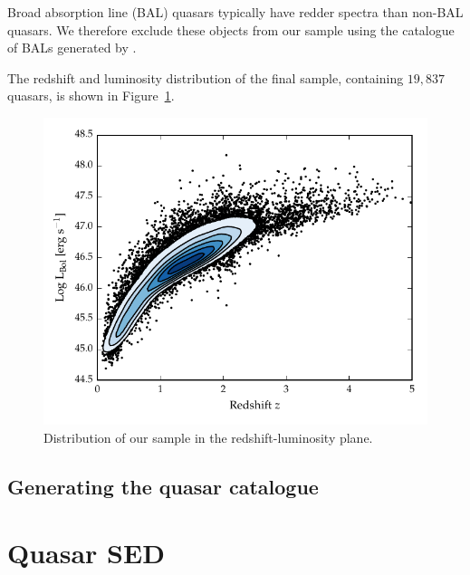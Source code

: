 Broad absorption line (BAL) quasars typically have redder spectra than non-BAL quasars. 
We therefore exclude these objects from our sample using the catalogue of BALs generated by \citet{allen11}.

The redshift and luminosity distribution of the final sample, containing $19,837$ quasars, is shown in Figure~\ref{fig:lum_z}. 

\begin{figure}
  \centering
  \includegraphics[width=\textwidth]{figures/chapter05/lum_z.pdf}
  \caption[{Distribution of our sample in the redshift-luminosity plane.}]{Distribution of our sample in the redshift-luminosity plane. }
  \label{fig:lum_z}
\end{figure}


\subsection{Generating the quasar catalogue}

\section{Quasar SED}

